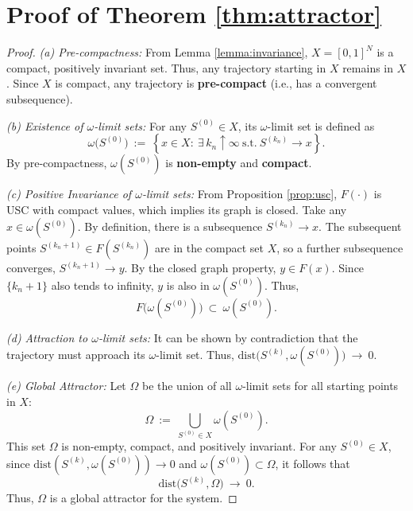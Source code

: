 \documentclass{ccjnl}
\begin{document}
\section{Proof of Theorem \ref{thm:attractor}}
\label{app:proof_thm_attractor}
\begin{proof}
\textit{(a) Pre-compactness:}
From Lemma \ref{lemma:invariance}, $X=[0,1]^N$ is a compact, positively invariant set. Thus, any trajectory starting in $X$ remains in $X$. Since $X$ is compact, any trajectory is \textbf{pre-compact} (i.e., has a convergent subsequence).

\textit{(b) Existence of $\omega$-limit sets:}
For any $S^{(0)}\in X$, its $\omega$-limit set is defined as
\begin{equation}
\omega\big(S^{(0)}\big)\ :=\ \left\{x\in X:\ \exists\,k_n\uparrow\infty\ \text{s.t.}\ S^{(k_n)}\to x\right\}.
\end{equation}
By pre-compactness, $\omega(S^{(0)})$ is \textbf{non-empty} and \textbf{compact}.

\textit{(c) Positive Invariance of $\omega$-limit sets:}
From Proposition \ref{prop:usc}, $F(\cdot)$ is USC with compact values, which implies its graph is closed. Take any $x \in \omega(S^{(0)})$. By definition, there is a subsequence $S^{(k_n)} \to x$. The subsequent points $S^{(k_n+1)} \in F(S^{(k_n)})$ are in the compact set $X$, so a further subsequence converges, $S^{(k_n+1)} \to y$. By the closed graph property, $y \in F(x)$. Since $\{k_n+1\}$ also tends to infinity, $y$ is also in $\omega(S^{(0)})$. Thus,
\begin{equation}
F\big(\omega(S^{(0)})\big)\ \subset\ \omega(S^{(0)}).
\end{equation}

\textit{(d) Attraction to $\omega$-limit sets:}
It can be shown by contradiction that the trajectory must approach its $\omega$-limit set. Thus, $\mathrm{dist}\big(S^{(k)},\omega(S^{(0)})\big)\ \to\ 0$.

\textit{(e) Global Attractor:}
Let $\Omega$ be the union of all $\omega$-limit sets for all starting points in $X$:
\begin{equation}
\Omega\ :=\ \bigcup_{S^{(0)}\in X} \omega(S^{(0)}).
\end{equation}
This set $\Omega$ is non-empty, compact, and positively invariant. For any $S^{(0)}\in X$, since $\mathrm{dist}(S^{(k)},\omega(S^{(0)}))\to 0$ and $\omega(S^{(0)})\subset\Omega$, it follows that
\begin{equation}
\mathrm{dist}\big(S^{(k)},\Omega\big)\ \to\ 0.
\end{equation}
Thus, $\Omega$ is a global attractor for the system.
\end{proof}
\end{document}
